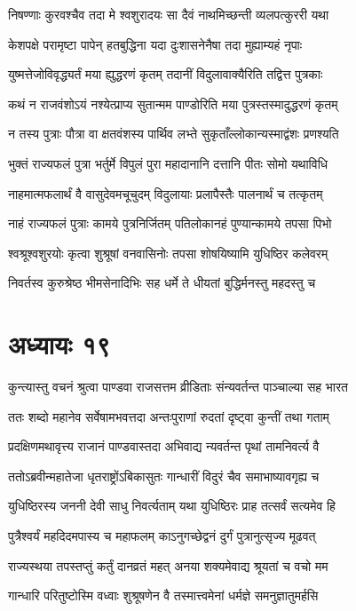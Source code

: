 \twolineshloka
{निषण्णाः कुरवश्चैव तदा मे श्वशुरादयः}
{सा दैवं नाथमिच्छन्ती व्यलपत्कुररी यथा}


\twolineshloka
{केशपक्षे परामृष्टा पापेन् हतबुद्धिना}
{यदा दुःशासनेनैषा तदा मुह्याम्यहं नृपाः}


\twolineshloka
{युष्मत्तेजोविवृद्ध्यर्तं मया ह्युद्धरणं कृतम्}
{तदानीं विदुलावाक्यैरिति तद्वित्त पुत्रकाः}


\twolineshloka
{कथं न राजवंशोऽयं नश्येत्प्राप्य सुतान्मम}
{पाण्डोरिति मया पुत्रस्तस्मादुद्धरणं कृतम्}


\twolineshloka
{न तस्य पुत्राः पौत्रा वा क्षतवंशस्य पार्थिव}
{लभ्ते सुकृताँल्लोकान्यस्माद्वंशः प्रणश्यति}


\twolineshloka
{भुक्तं राज्यफलं पुत्रा भर्तुर्मे विपुलं पुरा}
{महादानानि दत्तानि पीतः सोमो यथाविधि}


\twolineshloka
{नाहमात्मफलार्थं वै वासुदेवमचूचुदम्}
{विदुलायाः प्रलापैस्तैः पालनार्थं च तत्कृतम्}


\twolineshloka
{नाहं राज्यफलं पुत्राः कामये पुत्रनिर्जितम्}
{पतिलोकानहं पुण्यान्कामये तपसा पिभो}


\twolineshloka
{श्वश्रूश्वशुरयोः कृत्वा शुश्रूषां वनवासिनोः}
{तपसा शोषयिष्यामि युधिष्ठिर कलेवरम्}


\twolineshloka
{निवर्तस्व कुरुश्रेष्ठ भीमसेनादिभिः सह}
{धर्मे ते धीयतां बुद्धिर्मनस्तु महदस्तु च}


\chapter{अध्यायः १९}
\twolineshloka
{कुन्त्यास्तु वचनं श्रुत्वा पाण्डवा राजसत्तम}
{व्रीडिताः संन्यवर्तन्त पाञ्चाल्या सह भारत}


\twolineshloka
{ततः शब्दो महानेव सर्वेषामभवत्तदा}
{अन्तःपुराणां रुदतां दृष्ट्वा कुन्तीं तथा गताम्}


\twolineshloka
{प्रदक्षिणमथावृत्त्य राजानं पाण्डवास्तदा}
{अभिवाद्य न्यवर्तन्त पृथां तामनिवर्त्य वै}


\twolineshloka
{ततोऽब्रवीन्महातेजा धृतराष्ट्रोंऽबिकासुतः}
{गान्धारीं विदुरं चैव समाभाष्यावगृह्य च}


\twolineshloka
{युधिष्ठिरस्य जननी देवी साधु निवर्त्यताम्}
{यथा युधिष्ठिरः प्राह तत्सर्वं सत्यमेव हि}


\twolineshloka
{पुत्रैश्वर्यं महदिदमपास्य च महाफलम्}
{काऽनुगच्छेद्वनं दुर्गं पुत्रानुत्सृज्य मूढवत्}


\twolineshloka
{राज्यस्थया तपस्तप्तुं कर्तुं दानव्रतं महत्}
{अनया शक्यमेवाद्य श्रूयतां च वचो मम}


\twolineshloka
{गान्धारि परितुष्टोस्मि वध्वाः शुश्रूषणेन वै}
{तस्मात्त्वमेनां धर्मज्ञे समनुज्ञातुमर्हसि}


